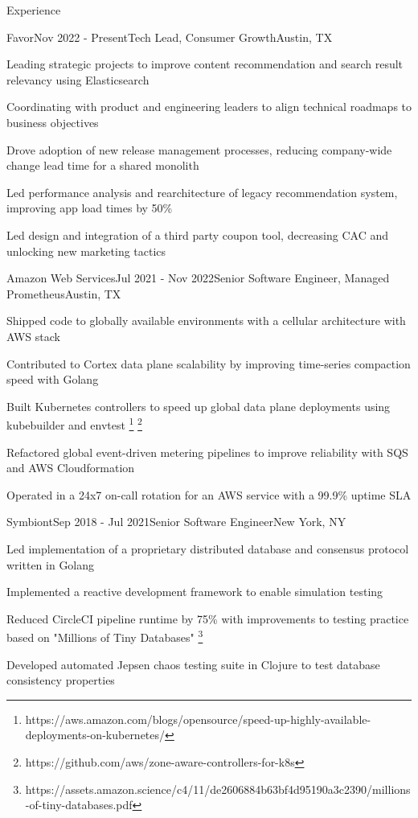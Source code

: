 \documentclass[
	11pt, %
]{resume} %
\begin{document}
\begin{rSection}{Experience}

	\begin{rSubsection}{Favor}{Nov 2022 - Present}{Tech Lead, Consumer Growth}{Austin, TX}
        \item Leading strategic projects to improve content recommendation and search result relevancy using Elasticsearch
        \item Coordinating with product and engineering leaders to align technical roadmaps to business objectives
        \item Drove adoption of new release management processes, reducing company-wide change lead time for a shared monolith
        \item Led performance analysis and rearchitecture of legacy recommendation system, improving app load times by 50\%
        \item Led design and integration of a third party coupon tool, decreasing CAC and unlocking new marketing tactics
	\end{rSubsection}


    \begin{rSubsection}{Amazon Web Services}{Jul 2021 - Nov 2022}{Senior Software Engineer, Managed Prometheus}{Austin, TX}
        \item Shipped code to globally available environments with a cellular architecture with AWS stack
        \item Contributed to Cortex data plane scalability by improving time-series compaction speed with Golang
        \item Built Kubernetes controllers to speed up global data plane deployments using kubebuilder and envtest \footnote{https://aws.amazon.com/blogs/opensource/speed-up-highly-available-deployments-on-kubernetes/} \footnote{https://github.com/aws/zone-aware-controllers-for-k8s}
        \item Refactored global event-driven metering pipelines to improve reliability with SQS and AWS Cloudformation
        \item Operated in a 24x7 on-call rotation for an AWS service with a 99.9\% uptime SLA
    \end{rSubsection}

    \begin{rSubsection}{Symbiont}{Sep 2018 - Jul 2021}{Senior Software Engineer}{New York, NY}
        \item Led implementation of a proprietary distributed database and consensus protocol written in Golang
        \item Implemented a reactive development framework to enable simulation testing
        \item Reduced CircleCI pipeline runtime by 75\% with improvements to testing practice based on "Millions of Tiny Databases" \footnote{https://assets.amazon.science/c4/11/de2606884b63bf4d95190a3c2390/millions-of-tiny-databases.pdf}
        \item Developed automated Jepsen chaos testing suite in Clojure to test database consistency properties
    \end{rSubsection}


\end{rSection}
\end{document}

